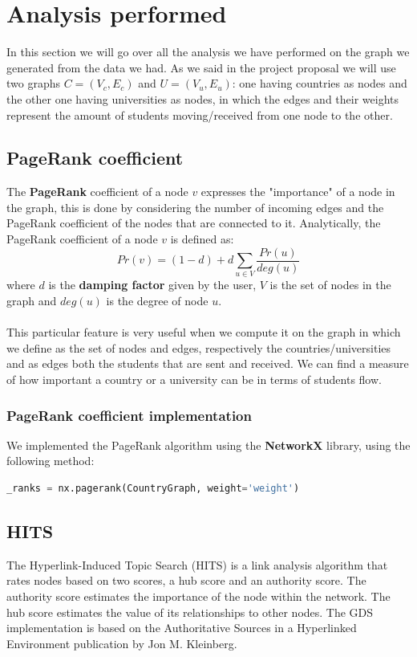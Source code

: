 \section{Analysis performed}
    In this section we will go over all the analysis we have performed on the graph we generated from the data we had.
    As we said in the project proposal we will use two graphs $C = (V_c, E_c)$ and $U = (V_u, E_u)$: 
    one having countries as nodes and the other one having universities as nodes, 
    in which the edges and their weights represent the amount of students moving/received from one node to the other.

    \subsection*{PageRank coefficient}

    The \textbf{PageRank} coefficient of a node $v$ expresses the "importance" of a node in the graph, this is done by considering the 
    number of incoming edges and the PageRank coefficient of the nodes that are connected to it. Analytically, the PageRank coefficient of a node $v$ is defined as:
    \begin{equation}
        Pr(v) = (1-d) + d \sum_{u \in V} \frac{Pr(u)}{deg(u)}
    \end{equation}
    where $d$ is the \textbf{damping factor} given by the user, $V$ is the set of nodes in the graph and $deg(u)$ is the degree of node $u$.
    \\\\
    This particular feature is very useful when we compute it on the graph in which we define as the set of nodes and edges, respectively the 
    countries/universities and as edges both the students that are sent and received. We can find a measure of how important a country or a 
    university can be in terms of students flow.
    \subsubsection*{PageRank coefficient implementation}
    We implemented the PageRank algorithm using the \textbf{NetworkX} library, using the following method:
    \begin{lstlisting}[language=python]
      _ranks = nx.pagerank(CountryGraph, weight='weight')
    \end{lstlisting}

    \subsection*{HITS}
    The Hyperlink-Induced Topic Search (HITS) is a link analysis algorithm that rates nodes based on two scores, 
    a hub score and an authority score. The authority score estimates the importance of the node within the network. 
    The hub score estimates the value of its relationships to other nodes. 
    The GDS implementation is based on the Authoritative Sources in a Hyperlinked Environment publication by Jon M. Kleinberg.
